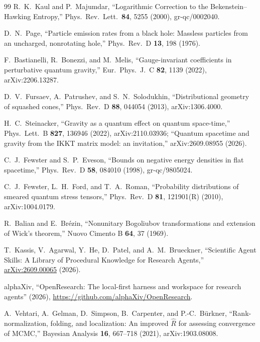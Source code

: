 \documentclass[onecolumn,11pt,aps,prd,amsmath,amssymb,nofootinbib,floatfix]{revtex4-2}
\begin{document}
\begin{thebibliography}{99}
R.~K.~Kaul and P.~Majumdar, ``Logarithmic Correction to the Bekenstein--Hawking Entropy,'' Phys.\ Rev.\ Lett.\ \textbf{84}, 5255 (2000), gr-qc/0002040.

D.~N.~Page, ``Particle emission rates from a black hole: Massless particles from an uncharged, nonrotating hole,'' Phys.\ Rev.\ D \textbf{13}, 198 (1976).

F.~Bastianelli, R.~Bonezzi, and M.~Melis, ``Gauge-invariant coefficients in perturbative quantum gravity,'' Eur.\ Phys.\ J.\ C \textbf{82}, 1139 (2022), arXiv:2206.13287.

D.~V.~Fursaev, A.~Patrushev, and S.~N.~Solodukhin, ``Distributional geometry of squashed cones,'' Phys.\ Rev.\ D \textbf{88}, 044054 (2013), arXiv:1306.4000.

H.~C.~Steinacker, ``Gravity as a quantum effect on quantum space-time,'' Phys.\ Lett.\ B \textbf{827}, 136946 (2022), arXiv:2110.03936; ``Quantum spacetime and gravity from the IKKT matrix model: an invitation,'' arXiv:2609.08955 (2026).

C.~J.~Fewster and S.~P.~Eveson, ``Bounds on negative energy densities in flat spacetime,'' Phys.\ Rev.\ D \textbf{58}, 084010 (1998), gr-qc/9805024.

C.~J.~Fewster, L.~H.~Ford, and T.~A.~Roman, ``Probability distributions of smeared quantum stress tensors,'' Phys.\ Rev.\ D \textbf{81}, 121901(R) (2010), arXiv:1004.0179.

R.~Balian and E.~Br\'ezin, ``Nonunitary Bogoliubov transformations and extension of Wick's theorem,'' Nuovo Cimento B \textbf{64}, 37 (1969).

T.~Kassis, V.~Agarwal, Y.~He, D.~Patel, and A.~M.~Brueckner, ``Scientific Agent Skills: A Library of Procedural Knowledge for Research Agents,'' \href{https://doi.org/10.48550/arXiv.2609.00065}{arXiv:2609.00065} (2026).

alphaXiv, ``OpenResearch: The local-first harness and workspace for research agents'' (2026), \url{https://github.com/alphaXiv/OpenResearch}.

A.~Vehtari, A.~Gelman, D.~Simpson, B.~Carpenter, and P.-C.~B\"urkner, ``Rank-normalization, folding, and localization: An improved $\widehat R$ for assessing convergence of MCMC,'' Bayesian Analysis \textbf{16}, 667--718 (2021), arXiv:1903.08008.


\end{thebibliography}
\end{document}
